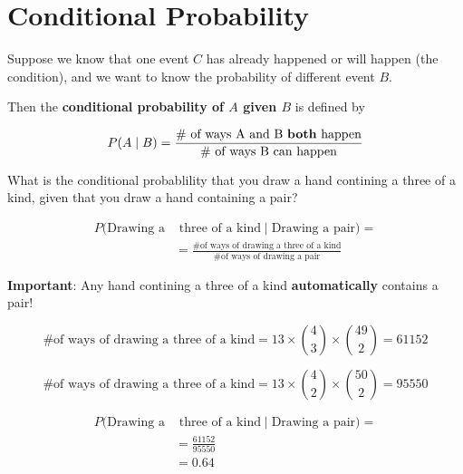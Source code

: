 \section{Conditional Probability}

%
\begin{frame}

Suppose we know that one event $C$ has already happened or will happen (the
condition), and we want to know the probability of different event $B$.

Then the \textbf{conditional probability of $A$ given $B$} is defined by

$$ P(A \mid B) = \frac{\text{\# of ways A and B \textbf{both} happen}}{\text{\#
of ways B can happen}} $$

\end{frame}
%

%
\begin{frame}

What is the conditional probablility that you draw a hand contining a three of a
kind, given that you draw a hand containing a pair?

\begin{align*}
P(\text{Drawing a} & \text{ three of a kind} \mid \text{Drawing a pair}) = \\ 
&= \frac{\text{\# of ways of drawing a three of a kind}}{\text{\# of ways of
drawing a pair}}
\end{align*}

\textbf{Important}: Any hand contining a three of a kind \textbf{automatically}
contains a pair!

\end{frame}
%

%
\begin{frame}

$$ \text{\# of ways of drawing a three of a kind} = 13 \times {{4}\choose{3}}
\times {{49}\choose{2}} = 61152 $$

$$ \text{\# of ways of drawing a three of a kind} = 13 \times {{4}\choose{2}}
\times {{50}\choose{2}} = 95550 $$

\end{frame}
%

%
\begin{frame}

\begin{align*}
P(\text{Drawing a} & \text{ three of a kind} \mid \text{Drawing a pair}) = \\ 
&= \frac{61152}{95550} \\
&= 0.64
\end{align*}

\end{frame}
%


